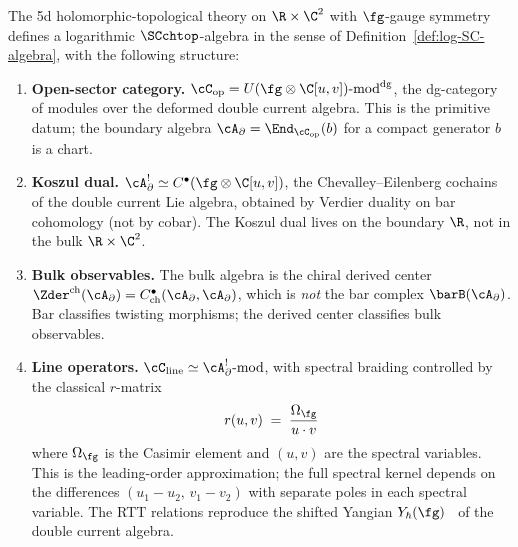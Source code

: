 \begin{theorem}
\label{thm:DDCA-swiss-cheese}
The 5d holomorphic-topological theory on
$\R \times \C^2$ with $\fg$-gauge symmetry defines a
logarithmic $\SCchtop$-algebra in the sense of
Definition~\textup{\ref{def:log-SC-algebra}}, with the
following structure:
\begin{enumerate}[label=\textup{(\roman*)},nosep]
\item \textbf{Open-sector category.}
 $\cC_{\mathrm{op}} =
 U(\fg\otimes\C[u,v])\text{-}\mathrm{mod}^{\mathrm{dg}}$,
 the dg-category of modules over the deformed double
 current algebra. This is the primitive datum;
 the boundary algebra
 $\cA_\partial = \End_{\cC_{\mathrm{op}}}(b)$ for a
 compact generator $b$ is a chart.
\item \textbf{Koszul dual.}
 $\cA^!_\partial \simeq
 C^\bullet(\fg\otimes\C[u,v])$,
 the Chevalley--Eilenberg cochains of the double
 current Lie algebra, obtained by Verdier duality on bar
 cohomology \textup{(}not by cobar\textup{)}. The Koszul
 dual lives on the boundary $\R$, not in the
 bulk $\R \times \C^2$.
\item \textbf{Bulk observables.}
 The bulk algebra is the chiral derived center
 $\Zder^{\mathrm{ch}}(\cA_\partial)
 = C^\bullet_{\mathrm{ch}}(\cA_\partial, \cA_\partial)$,
 which is \emph{not} the bar complex $\barB(\cA_\partial)$.
 Bar classifies twisting morphisms; the derived center
 classifies bulk observables.
\item \textbf{Line operators.}
 $\cC_{\mathrm{line}} \simeq
 \cA^!_\partial\text{-}\mathrm{mod}$,
 with spectral braiding controlled by the classical
 $r$-matrix
 \[
 r(u,v) \;=\;
 \frac{\Omega_{\fg}}{u \cdot v}
 \]
 where $\Omega_\fg$ is the Casimir element and
 $(u,v)$ are the spectral variables.
 This is the leading-order approximation; the full
 spectral kernel depends on the differences
 $(u_1 - u_2,\, v_1 - v_2)$ with separate poles in
 each spectral variable.
 The RTT relations reproduce the shifted Yangian
 $Y_\hbar(\fg)$~\cite{DNP2025} of the double
 current algebra.
\end{enumerate}
\end{theorem}

